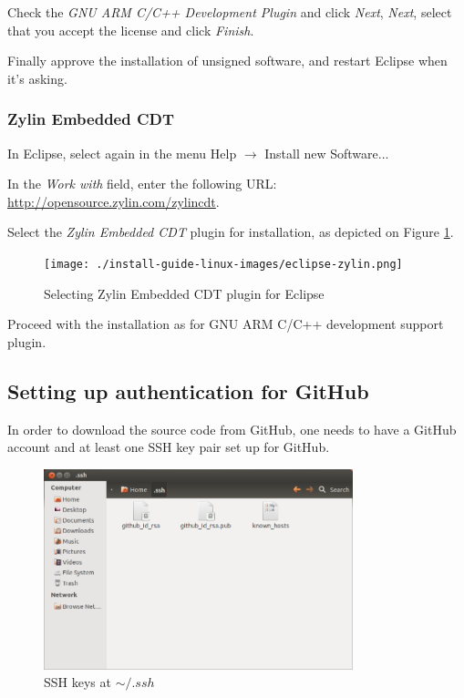 \documentclass[a4paper, 10pt]{article}
\begin{document}
Check the \emph{GNU ARM C/C++ Development Plugin} and click \emph{Next},
\emph{Next}, select that you accept the license and click \emph{Finish}.

Finally approve the installation of unsigned software,
and restart Eclipse when it's asking.

\subsubsection{Zylin Embedded CDT}

In Eclipse, select again in the menu Help $\rightarrow$ Install new Software...

In the \emph{Work with} field, enter the following URL:
\url{http://opensource.zylin.com/zylincdt}.

Select the \emph{Zylin Embedded CDT} plugin for installation,
as depicted on Figure \ref{fig:eclipse-zylin}.

    \begin{figure}[H]
    \centering
        \texttt{[image: ./install-guide-linux-images/eclipse-zylin.png]}
        \caption{Selecting Zylin Embedded CDT plugin for Eclipse}
        \label{fig:eclipse-zylin}
    \end{figure}

Proceed with the installation as for GNU ARM C/C++ development support plugin.

\subsection{Setting up authentication for GitHub}

In order to download the source code from GitHub, one needs to
have a GitHub account and at least one SSH key pair set up for GitHub.

    \begin{figure}[H]
    \centering
        \includegraphics[width=0.8\textwidth]{./install-guide-linux-images/auth-copied.png}
        \caption{SSH keys at $ \sim/.ssh $ }
        \label{fig:auth-copied}
    \end{figure}
\end{document}
